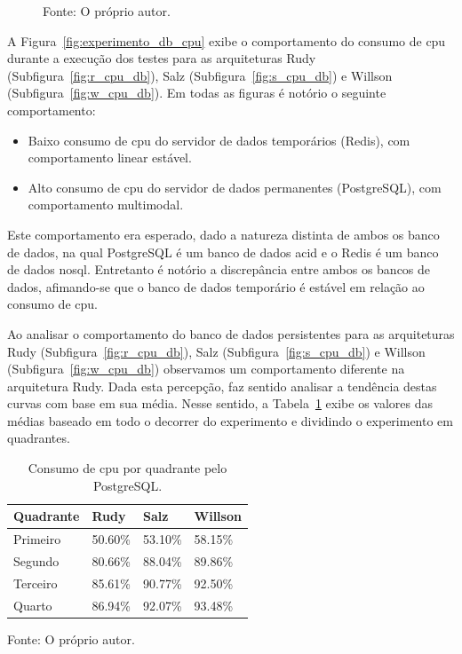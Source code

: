 \begin{figure}[htb!]
    Fonte: O próprio autor.
\end{figure}


A Figura~\ref{fig:experimento_db_cpu} exibe o comportamento do consumo de \ac{cpu} durante a execução dos testes para as arquiteturas Rudy (Subfigura~\ref{fig:r_cpu_db}), Salz (Subfigura~\ref{fig:s_cpu_db}) e Willson (Subfigura~\ref{fig:w_cpu_db}).
%
Em todas as figuras é notório o seguinte comportamento:

\begin{itemize}
 \item Baixo consumo de \ac{cpu} do servidor de dados temporários (Redis), com comportamento linear estável.
 \item Alto consumo de \ac{cpu} do servidor de dados permanentes (PostgreSQL), com comportamento multimodal.
\end{itemize}

Este comportamento era esperado, dado a natureza distinta de ambos os banco de dados, na qual PostgreSQL é um banco de dados \ac{acid} e o Redis é um banco de dados \ac{nosql}.
%
Entretanto é notório a discrepância entre ambos os bancos de dados, afimando-se que o banco de dados temporário é estável em relação ao consumo de \ac{cpu}.

Ao analisar o comportamento do banco de dados persistentes para as arquiteturas Rudy (Subfigura~\ref{fig:r_cpu_db}), Salz (Subfigura~\ref{fig:s_cpu_db}) e Willson (Subfigura~\ref{fig:w_cpu_db}) observamos um comportamento diferente na arquitetura Rudy.
%
Dada esta percepção, faz sentido analisar a tendência destas curvas com base em sua média.
%
Nesse sentido, a Tabela~\ref{tab:cpu_db_media_quadrantes} exibe os valores das médias baseado em todo o decorrer do experimento e dividindo o experimento em quadrantes.

\begin{table}[htb!]
\centering
\begin{adjustbox}{max width=\textwidth}
\caption{Consumo de \ac{cpu} por quadrante pelo PostgreSQL.}
\label{tab:cpu_db_media_quadrantes}
\begin{tabular}{l|l|l|l}

\hline \hline

Quadrante & Rudy    & Salz    & Willson \\ \hline \hline

Primeiro  & 50.60\% & 53.10\% & 58.15\% \\ \hline

Segundo   & 80.66\% & 88.04\% & 89.86\% \\ \hline

Terceiro  & 85.61\% & 90.77\% & 92.50\% \\ \hline

Quarto    & 86.94\% & 92.07\% & 93.48\% \\ \hline \hline

\end{tabular}

\end{adjustbox}

Fonte: O próprio autor.
\end{table}

